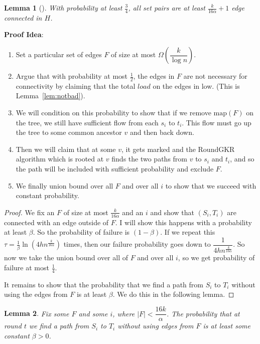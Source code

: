 \documentclass[12pt]{article}
\newtheorem{lemma}{Lemma}
\begin{document}
\begin{lemma}[\cite{ssc}]
\label{lem:connected}
With probability at least $\frac{3}{4}$, all set pairs are at least $\frac{k}{16\alpha} + 1$ edge connected in $H$. 
\end{lemma}

\textbf{Proof Idea}:
\begin{enumerate}
\item Set a particular set of edges $F$ of size at most $\Omega(\dfrac{k}{\log n})$. 
\item Argue that with probability at most $\frac{1}{2}$, the edges in $F$ are not necessary for connectivity by claiming that the total $load$ on the edges in low. (This is Lemma~\ref{lem:notbad}). 
\item We will condition on this probability to show that if we remove $\text{map}(F)$ on the tree, we still have sufficient flow from each $s_i$ to $t_i$. This flow must go up the tree to some common ancestor $v$ and then back down.
\item Then we will claim that at some $v$, it gets marked and the RoundGKR algorithm which is rooted at $v$ finds the two paths from $v$ to $s_i$ and $t_i$, and so the path will be included with sufficient probability and exclude $F$.
\item We finally union bound over all $F$ and over all $i$ to show that we succeed with constant probability. 
\end{enumerate}

\begin{proof}
We fix an $F$ of size at most $\frac{k}{16\alpha}$ and an $i$ and show that $(S_i, T_i)$ are connected with an edge outside of $F$. I will show this happens with a probability at least $\beta$. So the probability of failure is $(1-\beta)$. If we repeat this $\tau = \frac{1}{\beta}\ln(4hn^{\frac{k}{16\alpha}})$ times, then our failure probability goes down to $\dfrac{1}{4hn^{\frac{k}{16\alpha}}}$. So now we take the union bound over all of $F$ and over all $i$, so we get probability of failure at most $\frac{1}{4}$.

It remains to show that the probability that we find a path from $S_i$ to $T_i$ without using the edges from $F$ is at least $\beta$. We do this in the following lemma.
\end{proof}

\begin{lemma}
Fix some $F$ and some $i$, where $|F| < \dfrac{16k}{\alpha}$. The probability that at round $t$ we find a path from $S_i$ to $T_i$ without using edges from $F$ is at least some constant $\beta > 0$. 
\end{lemma}
\end{document}

